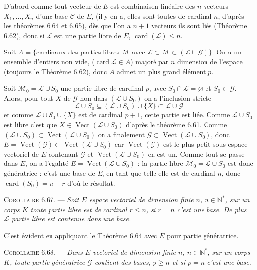 D'abord comme tout vecteur de $E$ est combinaison linéaire des $n$ vecteurs $X_1,\ldots,X_n$ d'une base $\mathcal C$ de $E$, (il y en a, elles sont toutes de cardinal $n$, d'après les théorèmes 6.64 et 6.65), dès que l'on a $n+1$ vecteurs ils sont liés (Théorème 6.62), donc si $\mathcal L$ est une partie libre de $E$, $\operatorname{card}(\mathcal L)\le n$.

Soit $A=\{$cardinaux des parties libres $\mathcal M$ avec $\mathcal L\subset\mathcal M\subset(\mathcal L\cup\mathcal G)\}$. On a un ensemble d'entiers non vide, ($\operatorname{card}\mathcal L\in A$) majoré par $n$ dimension de l'espace (toujours le Théorème 6.62), donc $A$ admet un plus grand élément $p$.

Soit $\mathcal M_0=\mathcal L\cup S_0$ une partie libre de cardinal $p$, avec $S_0\cap\mathcal L=\varnothing$ et $S_0\subset\mathcal G$. Alors, pour tout $X$ de $\mathcal G$ non dans $(\mathcal L\cup S_0)$ on a l'inclusion stricte
\[
\mathcal L\cup S_0\subsetneq(\mathcal L\cup S_0)\cup\{X\}\subset\mathcal L\cup\mathcal G
\]
et comme $\mathcal L\cup S_0\cup\{X\}$ est de cardinal $p+1$, cette partie est liée. Comme $\mathcal L\cup S_0$ est libre c'est que $X\in\operatorname{Vect}(\mathcal L\cup S_0)$ d'après le théorème 6.61. Comme $(\mathcal L\cup S_0)\subset\operatorname{Vect}(\mathcal L\cup S_0)$ on a finalement $\mathcal G\subset\operatorname{Vect}(\mathcal L\cup S_0)$, donc $E=\operatorname{Vect}(\mathcal G)\subset\operatorname{Vect}(\mathcal L\cup S_0)$ car $\operatorname{Vect}(\mathcal G)$ est le plus petit sous-espace vectoriel de $E$ contenant $\mathcal G$ et $\operatorname{Vect}(\mathcal L\cup S_0)$ en est un. Comme tout se passe dans $E$, on a l'égalité $E=\operatorname{Vect}(\mathcal L\cup S_0)$ : la partie libre $\mathcal M_0=\mathcal L\cup S_0$ est donc génératrice : c'est une base de $E$, en tant que telle elle est de cardinal $n$, donc $\operatorname{card}(S_0)=n-r$ d'où le résultat. \bookend

\medskip\noindent\textsc{Corollaire 6.67.} --- \emph{Soit $E$ espace vectoriel de dimension finie $n$, $n\in\mathbb N^*$, sur un corps $K$ toute partie libre est de cardinal $r\le n$, si $r=n$ c'est une base. De plus $\mathcal L$ partie libre est contenue dans une base.}

C'est évident en appliquant le Théorème 6.64 avec $E$ pour partie génératrice.

\medskip\noindent\textsc{Corollaire 6.68.} --- \emph{Dans $E$ vectoriel de dimension finie $n$, $n\in\mathbb N^*$, sur un corps $K$, toute partie génératrice $\mathcal G$ contient des bases,  $p\ge n$ et si $p=n$ c'est une base.}

